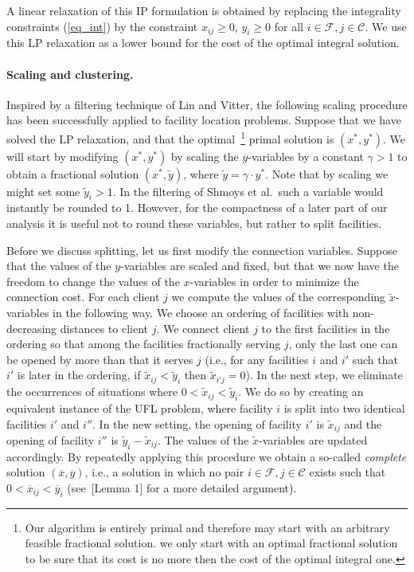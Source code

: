 \documentclass[11pt]{article}
\begin{document}
A linear relaxation of this IP formulation is obtained by
replacing the integrality constraints (\ref{eq_int}) by the
constraint
$x_{ij} \geq 0$, $y_i \geq 0$  for all $i \in \mathcal{F}, j \in \mathcal{C}$.
We use this LP relaxation as a
lower bound for the cost of the optimal integral solution.

\paragraph{Scaling and clustering.}
Inspired by a filtering technique of Lin and Vitter,
the following scaling procedure has been successfully applied
to facility location problems.
Suppose that we have solved the LP
relaxation, and that the optimal~\footnote{Our algorithm is entirely primal and therefore
may start with an arbitrary feasible fractional solution. we only start with an optimal fractional solution
to be sure that its cost is no more then the cost of the optimal integral one.} primal solution is $(x^*,y^*)$.
We will start by modifying 
$(x^*,y^*)$ by scaling the $y$-variables by a constant $\gamma >
1$ to obtain a fractional solution $(x^*,\tilde{y} )$, where $
\tilde{y} = \gamma \cdot y^*$.
Note that by scaling we might set some $\tilde{y}_i > 1$.
In the filtering of Shmoys et al.~such a variable
would instantly be rounded to 1. However, for the compactness
of a later part of our analysis it is useful not to round
these variables, but rather to split facilities. 


Before we discuss
splitting, let us first modify the connection variables.
Suppose that the values of the
$y$-variables are scaled and fixed, but that we now have the freedom to
change the values of the $x$-variables in order to minimize the
connection cost.
For each client $j$ we compute the values of the corresponding
$\tilde{x}$-variables in the following way. We choose an ordering
of facilities with non-decreasing distances to client $j$. We
connect client $j$ to the first facilities in the ordering so that
among the facilities fractionally serving $j$, only the last one
can be opened by more than that it serves
$j$ (i.e., for any facilities $i$ and $i'$ such that $i'$ is
later in the ordering, if $\tilde{x}_{ij} < \tilde{y}_i$ then
$\tilde{x}_{i'j}=0$).
In the next step, we eliminate the occurrences of
situations where $0 < \tilde{x}_{ij} < \tilde{y}_i$. We do so by
creating an equivalent instance of the UFL problem, where facility
$i$ is split into two identical facilities $i'$ and $i''$. In the
new setting, the opening of facility $i'$ is $\tilde{x}_{ij}$ and
the opening of facility $i''$ is $\tilde{y}_i - \tilde{x}_{ij}$.
The values of the $\tilde{x}$-variables are updated accordingly.
By repeatedly applying this procedure we obtain a so-called
\emph{complete} solution $(\overline{x}, \overline{y})$, i.e., a
solution in which no pair $i \in \mathcal{F}, j \in \mathcal{C}$
exists such that $0 < \overline{x}_{ij} < \overline{y}_i$
(see~\cite{DBLP:conf/ipco/Sviridenko02}[Lemma 1] for a more detailed argument).
\end{document}

